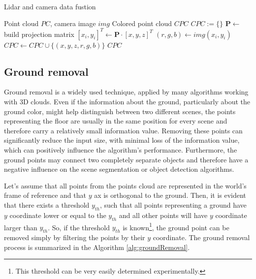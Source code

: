 \begin{algorithm}
    \caption{Lidar and camera data fustion}\label{alg:fusion}
    \begin{algorithmic}
        \Require Point cloud $PC$, camera image $img$
        \Ensure Colored point cloud $CPC$
        \State $CPC := \{\}$  
        \State $\mathbf{P} \leftarrow $ build projection matrix
         
        \State $[x_i,y_i]^T \leftarrow  \mathbf{P}\cdot[x,y,z]^T$ 
         
        \State $(r,g,b) \leftarrow  img(x_i,y_i)$  
        \State $CPC \leftarrow CPC \cup \{(x,y,z,r,g,b)\}$  
        \EndIf
        \EndFor
        \State\Return $CPC$
    \end{algorithmic}
\end{algorithm}

\subsection{Ground removal}

Ground removal is a widely used technique, applied by many algorithms working with 3D clouds. Even if the information about the ground, particularly about the ground color, might help distinguish between two different scenes, the points representing the floor are usually in the same position for every scene and therefore carry a relatively small information value. Removing these points can significantly reduce the input size, with minimal loss of the information value, which can positively influence the algorithm's performance. Furthermore, the ground points may connect two completely separate objects and therefore have a negative influence on the scene segmentation or object detection algorithms.\par
Let's assume that all points from the points cloud are represented in the world's frame of reference and that $y$ ax is orthogonal to the ground. Then, it is evident that there exists a threshold $y_{th}$, such that all points representing a ground have $y$ coordinate lower or equal to the $y_{th}$ and all other points will have $y$ coordinate larger than $y_{th}$. So, if the threshold $y_{th}$ is known\footnote{This threshold can be very easily determined experimentally.}, the ground point can be removed simply by filtering the points by their $y$ coordinate. The ground removal process is summarized in the Algorithm \ref{alg:groundRemoval}.

